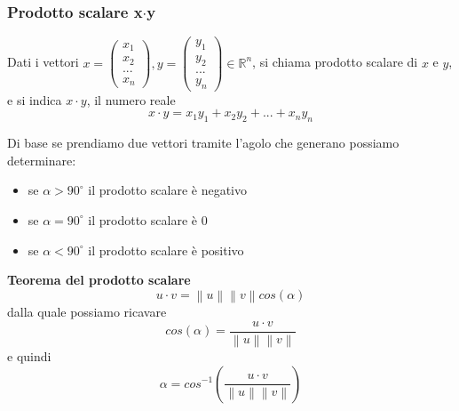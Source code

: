 \documentclass[../main.tex]{subfiles}
\begin{document}
\subsubsection{Prodotto scalare x$\cdot$y}
Dati i vettori $x = \begin{pmatrix}x_1 \\ x_2 \\ ... \\ x_n \end{pmatrix}, y = \begin{pmatrix}y_1 \\ y_2 \\ ... \\ y_n \end{pmatrix} \in \mathbb{R}^n$,
si chiama prodotto scalare di $x$ e $y$, e si indica $x \cdot y$, il numero reale
$$
    x \cdot y = x_1y_1 + x_2y_2 + ... + x_ny_n
$$

Di base se prendiamo due vettori tramite l'agolo che generano possiamo determinare:
\begin{itemize}
    \item se $\alpha > 90^{\circ}$ il prodotto scalare è negativo
    \item se $\alpha = 90^{\circ}$ il prodotto scalare è $0$
    \item se $\alpha < 90^{\circ}$ il prodotto scalare è positivo
\end{itemize}

\vspace{1cm}
\textbf{Teorema del prodotto scalare}
$$
   u \cdot v = \left\lVert u \right\rVert \left\lVert v \right\rVert cos(\alpha)
$$
dalla quale possiamo ricavare
$$
    cos(\alpha) = \frac{u \cdot v}{\left\lVert u\right\rVert \left\lVert v\right\rVert }
$$
e quindi
$$
    \alpha = cos^{-1}\left( \frac{u \cdot v}{\left\lVert u \right\rVert \left\lVert v \right\rVert } \right)
$$
\end{document}
